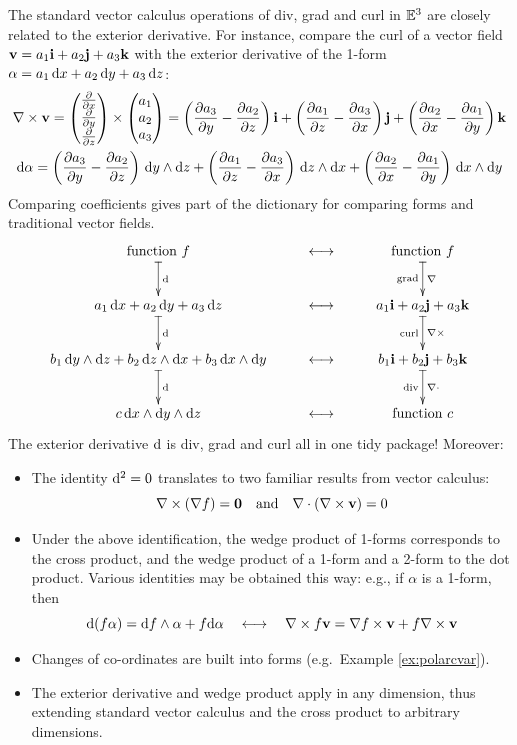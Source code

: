 The standard vector calculus operations of div, grad and curl in $\E^3$ are closely related to the exterior derivative. For instance, compare the curl of a vector field $\vv=a_1\vi+a_2\vj+a_3\vk$ with the exterior derivative of the 1-form $\alpha=a_1\,\dx+a_2\,\dy+a_3\,\dz$:
\begin{gather*}
\nabla\times\vv=
\threevec{\partials{x}}{\partials{y}}{\partials{z}}\times\threevec{a_1}{a_2}{a_3}
=\left(\partials[a_3]{y}-\partials[a_2]{z}\right)\vi+ \left(\partials[a_1]{z}-\partials[a_3]{x}\right)\vj+ \left(\partials[a_2]{x}-\partials[a_1]{y}\right)\vk\\
\D\alpha=\left(\partials[a_3]{y}-\partials[a_2]{z}\right)\,\dy\wedge\dz +\left(\partials[a_1]{z}-\partials[a_3]{x}\right)\,\dz\wedge\dx +\left(\partials[a_2]{x}-\partials[a_1]{y}\right)\,\dx\wedge\dy
\end{gather*}
Comparing coefficients gives part of the dictionary for comparing forms and traditional vector fields.
\[\xymatrix{
\text{function }f \ar@{|->}[d]^{\D} & \longleftrightarrow & \text{function }f \ar@{|->}[d]^{\nabla}_{\text{grad}}\\
a_1\,\dx+a_2\,\dy+a_3\,\dz \ar@{|->}[d]^{\D} & \longleftrightarrow & a_1\vi+a_2\vj+ a_3\vk \ar@{|->}[d]^{\nabla\times}_{\text{curl}}\\
b_1\,\dy\wedge\dz+b_2\,\dz\wedge\dx+b_3\,\dx\wedge\dy \ar@{|->}[d]^{\D} & \longleftrightarrow & b_1\vi+b_2\vj+b_3\vk \ar@{|->}[d]^{\nabla\cdot}_{\text{div}}\\
c\,\dx\wedge\dy\wedge\dz & \longleftrightarrow & \text{function }c
}\]
The exterior derivative $\D$ is div, grad and curl all in one tidy package! Moreover:

\begin{itemize}
  \item The identity $\D^2=0$ translates to two familiar results from vector calculus:
  \[\nabla\times(\nabla f)=\V0\quad\text{and}\quad\nabla\cdot(\nabla\times\vv)=0\]
  
  \item Under the above identification, the wedge product of 1-forms corresponds to the cross product, and the wedge product of a 1-form and a 2-form to the dot product. Various identities may be obtained this way: e.g., if $\alpha$ is a 1-form, then
  \[\D(f\alpha)=\df\wedge\alpha+f\D\alpha \quad\longleftrightarrow
\quad\nabla\times f\vv=\nabla f\times\vv+f\nabla\times\vv\]
	 	
  \item Changes of co-ordinates are built into forms (e.g.\ Example \ref{ex:polarcvar}).
  
  \item The exterior derivative and wedge product apply in any dimension, thus extending standard vector calculus and the cross product to arbitrary dimensions. 
\end{itemize}

